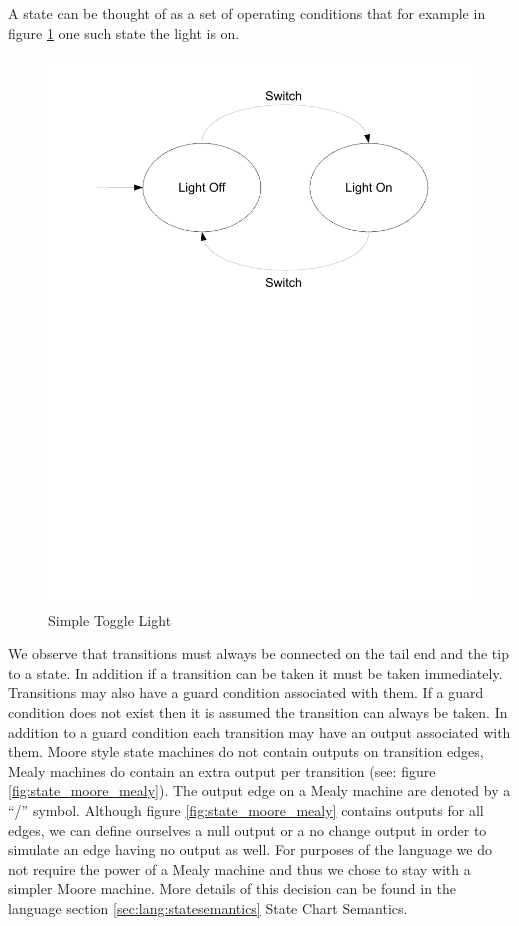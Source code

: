 A state can be thought of as a set of operating conditions that for example in figure \ref{fig:state_blink_light}
one such state the light is on.

\begin{figure}[htp]
    \centering
    \includegraphics[trim= 10mm 150mm 10mm 10mm, clip, width=\imgmedium]{./images/state_blink_light.pdf}
    \caption{Simple Toggle Light}
    \label{fig:state_blink_light}
\end{figure}

We observe that transitions must always be connected on the tail end and the tip to a state. In addition if a transition can be taken it must be taken immediately. Transitions may also have a guard condition associated with them. If a guard condition does not exist then it is assumed the transition can always be taken. In addition to a guard condition each transition may have an output associated with them. Moore style state machines do not contain outputs on transition edges, Mealy machines do contain an extra output per transition (see: figure \ref{fig:state_moore_mealy}). The output edge on a Mealy machine are denoted by a ``/'' symbol. Although figure \ref{fig:state_moore_mealy} contains outputs for all edges, we can define ourselves a null output or a no change output in order to simulate an edge having no output as well. For purposes of the \plccharts language we do not require the power of a Mealy machine and thus we chose to stay with a simpler Moore machine. More details of this decision can be found in the language section \ref{sec:lang:statesemantics} State Chart Semantics.

